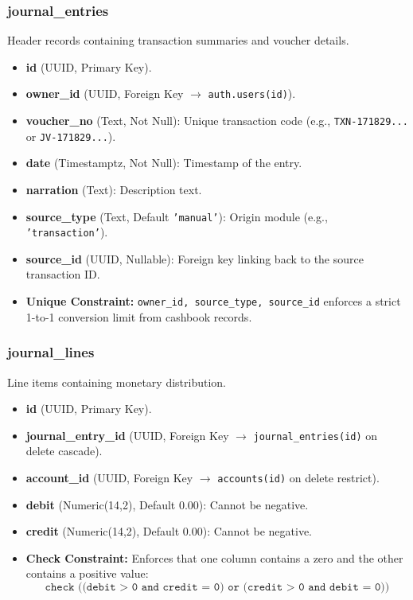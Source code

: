 \documentclass[journal, a4paper, onecolumn, 12pt]{IEEEtran}
\begin{document}
\subsubsection{\textbf{journal\_entries}}
Header records containing transaction summaries and voucher details.
\begin{itemize}[leftmargin=*]
    \item \textbf{id} (UUID, Primary Key).
    \item \textbf{owner\_id} (UUID, Foreign Key $\rightarrow$ \texttt{auth.users(id)}).
    \item \textbf{voucher\_no} (Text, Not Null): Unique transaction code (e.g., \texttt{TXN-171829...} or \texttt{JV-171829...}).
    \item \textbf{date} (Timestamptz, Not Null): Timestamp of the entry.
    \item \textbf{narration} (Text): Description text.
    \item \textbf{source\_type} (Text, Default \texttt{'manual'}): Origin module (e.g., \texttt{'transaction'}).
    \item \textbf{source\_id} (UUID, Nullable): Foreign key linking back to the source transaction ID.
    \item \textbf{Unique Constraint:} \texttt{owner\_id, source\_type, source\_id} enforces a strict 1-to-1 conversion limit from cashbook records.
\end{itemize}

\subsubsection{\textbf{journal\_lines}}
Line items containing monetary distribution.
\begin{itemize}[leftmargin=*]
    \item \textbf{id} (UUID, Primary Key).
    \item \textbf{journal\_entry\_id} (UUID, Foreign Key $\rightarrow$ \texttt{journal\_entries(id)} on delete cascade).
    \item \textbf{account\_id} (UUID, Foreign Key $\rightarrow$ \texttt{accounts(id)} on delete restrict).
    \item \textbf{debit} (Numeric(14,2), Default 0.00): Cannot be negative.
    \item \textbf{credit} (Numeric(14,2), Default 0.00): Cannot be negative.
    \item \textbf{Check Constraint:} Enforces that one column contains a zero and the other contains a positive value:
    \begin{equation}
        \texttt{check ((debit > 0 and credit = 0) or (credit > 0 and debit = 0))}
    \end{equation}
\end{itemize}
\end{document}

